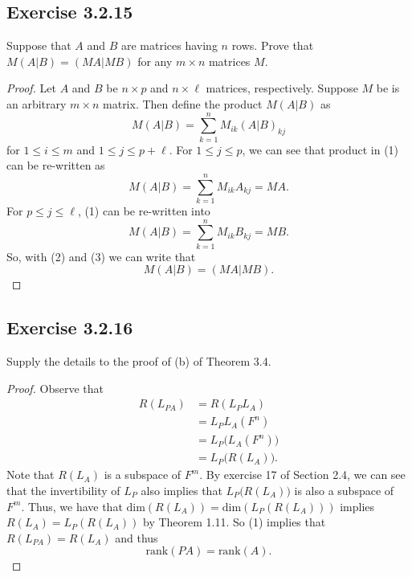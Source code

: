 \subsection*{Exercise 3.2.15} Suppose that \( A   \) and \( B  \) are matrices having \( n  \) rows. Prove that \( M(A|B) = (MA|MB) \) for any \( m \times n  \) matrices \( M  \).
\begin{proof}
Let \( A  \) and \( B  \) be \( n \times p  \) and \( n \times \ell  \) matrices, respectively. Suppose \( M  \) be is an arbitrary \( m \times n  \) matrix. Then define the product \( M (A | B ) \) as 
\[  M (A|B) = \sum_{ k =1  }^{ n  } {M}_{ik } (A | B)_{kj} \tag{1} \]
for \( 1 \leq i \leq m  \) and \( 1 \leq j \leq  p + \ell  \). For \( 1 \leq j \leq p  \), we can see that product in (1) can be re-written as
\[  M (A|B) = \sum_{ k= 1  }^{ n } {M}_{ik } {A}_{kj} = MA. \tag{2} \]
For \( p \leq j \leq \ell  \), (1) can be re-written into
\[  M (A|B) = \sum_{ k=1  }^{ n } {M}_{ik } {B}_{kj} = MB. \tag{3} \]
So, with (2) and (3) we can write that
\[  M (A|B) = (MA | MB). \]
\end{proof}

\subsection*{Exercise 3.2.16} Supply the details to the proof of (b) of Theorem 3.4.
\begin{proof}
Observe that
\begin{align*}
   R({L}_{PA}) &= R({L}_{P} {L}_{A}) \\
               &=  {L}_{P} {L}_{A}(F^{n}) \\
               &= {L}_{P} \Big( {L}_{A} (F^{n}) \Big) \\
               &= {L}_{P} \Big(  R( {L}_{A}) \Big). \tag{1}
\end{align*}
Note that \( R({L}_{A})  \) is a subspace of \( F^{m} \). By exercise 17 of Section 2.4, we can see that the invertibility of \( {L}_{P} \) also implies that \( {L}_{P}\Big(R({L}_{A})\Big) \) is also a subspace of \( F^{m} \). Thus, we have that \( \text{dim}(R({L}_{A})) = \text{dim}({L}_{P}({R}({L}_{A}))) \) implies \( R({L}_{A}) = {L}_{P}(R({L}_{A})) \) by Theorem 1.11. So (1) implies that \( R({L}_{PA}) = R({L}_{A})   \) and thus \[ \text{rank}(PA) = \text{rank}(A). \]
\end{proof}
